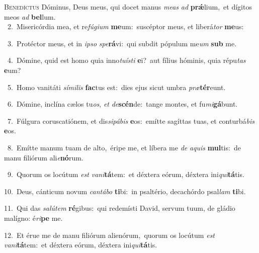 \lettrine{\initial\textcolor{\initialcolor}{B}}{enedíctus} Dóminus, Deus meus, qui docet manus \textit{me}\-\textit{as} \textit{ad} \textbf{prǽ}\-lium,~\star et dígitos meos \textit{ad} \textbf{bel}\-lum.\\
{\numbfont\textcolor{\numbcolor}{~2.}}~Misericórdia mea, et re\-\textit{fú}\-\textit{gi}\textit{um} \textbf{me}\-um:~\star suscéptor meus, et liberá\textit{tor} \textbf{me}\-us:\par
{\numbfont\textcolor{\numbcolor}{~3.}}~Protéctor meus, et in \textit{ip}\-\textit{so} \textit{spe}\-\textbf{rá}vi:~\star qui subdit pópulum me\textit{um} \textbf{sub} me.\par
{\numbfont\textcolor{\numbcolor}{~4.}}~Dómine, quid est homo quia inno\-\textit{tu}\-\textit{ís}\textit{ti} \textbf{e}\-i?~\star aut fílius hóminis, quia répu\textit{tas} \textbf{e}\-um?\par
{\numbfont\textcolor{\numbcolor}{~5.}}~Homo vanitáti \textit{sí}\-\textit{mi}\textit{lis} \textbf{fac}\-tus est:~\star dies ejus sicut umbra \textit{præ}\-\textbf{tér}eunt.\par
{\numbfont\textcolor{\numbcolor}{~6.}}~Dómine, inclína cælos tu\-\textit{os}\-, \textit{et} \textit{de}\-\textbf{scén}de:~\star tange montes, et fu\-\textit{mi}\-\textbf{gá}bunt.\par
{\numbfont\textcolor{\numbcolor}{~7.}}~Fúlgura coruscatiónem, et dis\-\textit{si}\-\textit{pá}\textit{bis} \textbf{e}\-os:~\star emítte sagíttas tuas, et conturbá\textit{bis} \textbf{e}\-os.\par
{\numbfont\textcolor{\numbcolor}{~8.}}~Emítte manum tuam de alto,~\dagger éripe me, et líbera me \textit{de} \textit{a}\-\textit{quis} \textbf{mul}\-tis:~\star de manu filiórum ali\-\textit{e}\-\textbf{nó}rum.\par
{\numbfont\textcolor{\numbcolor}{~9.}}~Quorum os locútum \textit{est} \textit{va}\-\textit{ni}\textbf{tá}tem:~\star et déxtera eórum, déxtera ini\-\textit{qui}\-\textbf{tá}tis.\par
{\numbfont\textcolor{\numbcolor}{10.}}~Deus, cánticum novum \textit{can}\-\textit{tá}\textit{bo} \textbf{ti}\-bi:~\star in psaltério, decachórdo psal\textit{lam} \textbf{ti}\-bi.\par
{\numbfont\textcolor{\numbcolor}{11.}}~Qui das \textit{sa}\-\textit{lú}\textit{tem} \textbf{ré}\-gibus:~\star qui redemísti David, servum tuum, de gládio malígno: é\-\textit{ri}\-\textbf{pe} me.\par
{\numbfont\textcolor{\numbcolor}{12.}}~Et érue me de manu filiórum alienórum,~\dagger quorum os locútum \textit{est} \textit{va}\-\textit{ni}\textbf{tá}tem:~\star et déxtera eórum, déxtera ini\-\textit{qui}\-\textbf{tá}tis.\par
